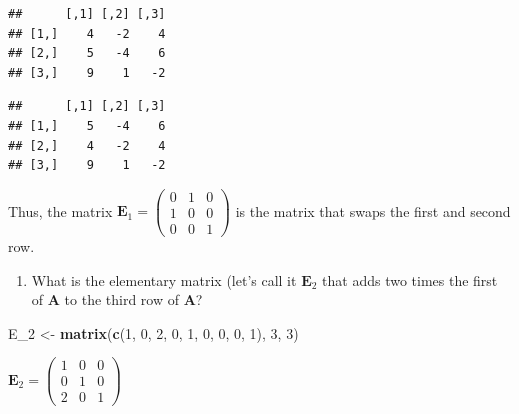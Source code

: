 \documentclass[
]{book}
\newenvironment{Shaded}{\begin{snugshade}}{\end{snugshade}}
\newcommand{\CommentTok}[1]{\textcolor[rgb]{0.56,0.35,0.01}{\textit{#1}}}
\newcommand{\DecValTok}[1]{\textcolor[rgb]{0.00,0.00,0.81}{#1}}
\newcommand{\KeywordTok}[1]{\textcolor[rgb]{0.13,0.29,0.53}{\textbf{#1}}}
\newcommand{\NormalTok}[1]{#1}
\newcommand{\OperatorTok}[1]{\textcolor[rgb]{0.81,0.36,0.00}{\textbf{#1}}}
\newcommand{\StringTok}[1]{\textcolor[rgb]{0.31,0.60,0.02}{#1}}
\providecommand{\tightlist}{%
  \setlength{\itemsep}{0pt}\setlength{\parskip}{0pt}}
\theoremstyle{definition}
\theoremstyle{definition}
\theoremstyle{definition}
\theoremstyle{definition}
\theoremstyle{remark}
\begin{document}
\begin{itemize}
\begin{verbatim}
##      [,1] [,2] [,3]
## [1,]    4   -2    4
## [2,]    5   -4    6
## [3,]    9    1   -2
\end{verbatim}

\begin{Shaded}
\end{Shaded}

\begin{verbatim}
##      [,1] [,2] [,3]
## [1,]    5   -4    6
## [2,]    4   -2    4
## [3,]    9    1   -2
\end{verbatim}

  Thus, the matrix \(\mathbf{E}_1 = \begin{pmatrix} 0 & 1 & 0 \\ 1 & 0 & 0 \\ 0 & 0 & 1 \end{pmatrix}\) is the matrix that swaps the first and second row.

  \begin{enumerate}
  \def\labelenumi{\arabic{enumi})}
  \setcounter{enumi}{1}
  \tightlist
  \item
    What is the elementary matrix (let's call it \(\mathbf{E}_2\) that adds two times the first of \(\mathbf{A}\) to the third row of \(\mathbf{A}\)?
  \end{enumerate}

\begin{Shaded}
\begin{Highlighting}[]
\NormalTok{E_}\DecValTok{2}\NormalTok{ <-}\StringTok{ }\KeywordTok{matrix}\NormalTok{(}\KeywordTok{c}\NormalTok{(}\DecValTok{1}\NormalTok{, }\DecValTok{0}\NormalTok{, }\DecValTok{2}\NormalTok{, }\DecValTok{0}\NormalTok{, }\DecValTok{1}\NormalTok{, }\DecValTok{0}\NormalTok{, }\DecValTok{0}\NormalTok{, }\DecValTok{0}\NormalTok{, }\DecValTok{1}\NormalTok{), }\DecValTok{3}\NormalTok{, }\DecValTok{3}\NormalTok{)}
\end{Highlighting}
\end{Shaded}

  \(\mathbf{E}_2 = \begin{pmatrix} 1 & 0 & 0 \\ 0 & 1 & 0 \\ 2 & 0 & 1 \end{pmatrix}\)


\end{itemize}
\end{document}
